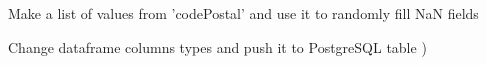 Make a list of values from 'codePostal' and use it to randomly fill NaN fields
\begin{figure}[H]
\centering
{}
\end{figure}
\begin{figure}[H]
\centering
{}
\end{figure}
\begin{figure}[H]
\centering
{}
\end{figure}

Change dataframe columns types and push it to PostgreSQL table )
\begin{figure}[H]
\centering
{}
\end{figure}

